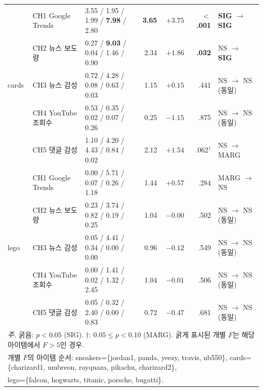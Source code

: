 \documentclass[11pt, a4paper, twocolumn]{article}
\begin{document}
\begin{table}[!tbp]
{\begin{tabular}{lp{2.6cm}p{4.2cm}rrrp{2.4cm}}
\midrule
\multirow{5}{*}{cards}
 & CH1 Google Trends & 3.55 / 1.95 / 1.99 / \textbf{7.98} / 2.80 & \textbf{3.65} & $+3.75$ & \textbf{$<$.001} & \textbf{SIG} $\rightarrow$ \textbf{SIG} \\
 & CH2 뉴스 보도량    & 0.27 / \textbf{9.03} / 0.04 / 1.46 / 0.90 & 2.34 & $+1.86$ & \textbf{.032} & NS $\rightarrow$ \textbf{SIG} \\
 & CH3 뉴스 감성      & 0.72 / 4.28 / 0.08 / 0.63 / 0.03      & 1.15 & $+0.15$ & .441 & NS $\rightarrow$ NS (동일) \\
 & CH4 YouTube 조회수 & 0.53 / 0.35 / 0.02 / 0.07 / 0.26      & 0.25 & $-1.15$ & .875 & NS $\rightarrow$ NS (동일) \\
 & CH5 댓글 감성     & 1.10 / 4.20 / 4.43 / 0.84 / 0.02      & 2.12 & $+1.54$ & .062$^\dagger$ & NS $\rightarrow$ MARG \\
\midrule
\multirow{5}{*}{lego}
 & CH1 Google Trends & 0.00 / 5.71 / 0.07 / 0.26 / 1.18      & 1.44 & $+0.57$ & .284 & MARG $\rightarrow$ NS \\
 & CH2 뉴스 보도량    & 0.23 / 3.74 / 0.82 / 0.19 / 0.25      & 1.04 & $-0.00$ & .502 & NS $\rightarrow$ NS (동일) \\
 & CH3 뉴스 감성      & 0.05 / 4.41 / 0.34 / 0.00 / 0.00      & 0.96 & $-0.12$ & .549 & NS $\rightarrow$ NS (동일) \\
 & CH4 YouTube 조회수 & 0.00 / 1.41 / 0.02 / 1.32 / 2.45      & 1.04 & $-0.01$ & .506 & NS $\rightarrow$ NS (동일) \\
 & CH5 댓글 감성     & 0.05 / 0.32 / 2.40 / 0.00 / 0.83      & 0.72 & $-0.47$ & .681 & NS $\rightarrow$ NS (동일) \\
\bottomrule
\multicolumn{7}{l}{\textit{주.} 굵음: $p<0.05$ (SIG). $\dagger$: $0.05\leq p<0.10$ (MARG). 굵게 표시된 개별 $F$는 해당 아이템에서 $F>5$인 경우.}\\
\multicolumn{7}{l}{개별 $F$의 아이템 순서: sneakers=\{jordan1, panda, yeezy, travis, nb550\}, cards=\{charizard1, umbreon, rayquaza, pikachu, charizard2\},}\\
\multicolumn{7}{l}{\hspace{1.6em}lego=\{falcon, hogwarts, titanic, porsche, bugatti\}.}\\
\end{tabular}}
\end{table}
\end{document}
